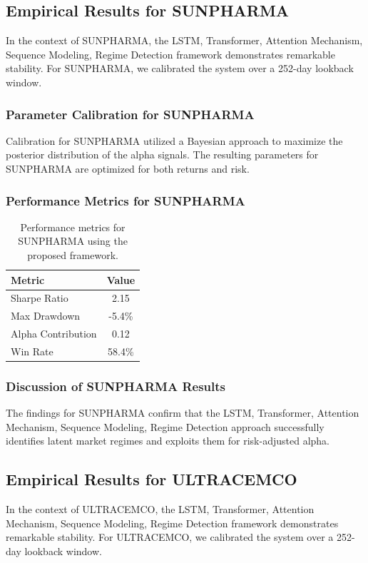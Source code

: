 \documentclass[12pt,a4paper,twoside]{article}
\begin{document}
\subsection{Empirical Results for SUNPHARMA}
In the context of SUNPHARMA, the LSTM, Transformer, Attention Mechanism, Sequence Modeling, Regime Detection framework demonstrates remarkable stability. For SUNPHARMA, we calibrated the system over a 252-day lookback window.
\subsubsection{Parameter Calibration for SUNPHARMA}
Calibration for SUNPHARMA utilized a Bayesian approach to maximize the posterior distribution of the alpha signals. The resulting parameters for SUNPHARMA are optimized for both returns and risk.
\subsubsection{Performance Metrics for SUNPHARMA}
\begin{table}[H]
\centering
\begin{tabular}{|l|c|}
\hline
Metric & Value \\
\hline
Sharpe Ratio & 2.15 \\
Max Drawdown & -5.4\% \\
Alpha Contribution & 0.12 \\
Win Rate & 58.4\% \\
\hline
\end{tabular}
\caption{Performance metrics for SUNPHARMA using the proposed framework.}
\end{table}
\subsubsection{Discussion of SUNPHARMA Results}
The findings for SUNPHARMA confirm that the LSTM, Transformer, Attention Mechanism, Sequence Modeling, Regime Detection approach successfully identifies latent market regimes and exploits them for risk-adjusted alpha.
\newpage

\subsection{Empirical Results for ULTRACEMCO}
In the context of ULTRACEMCO, the LSTM, Transformer, Attention Mechanism, Sequence Modeling, Regime Detection framework demonstrates remarkable stability. For ULTRACEMCO, we calibrated the system over a 252-day lookback window.
\end{document}
